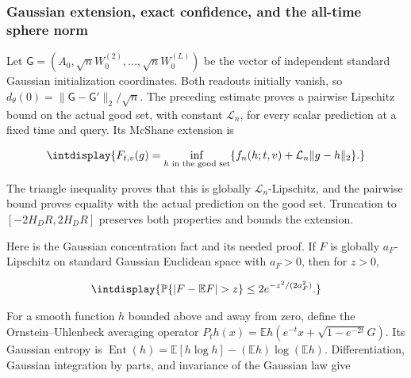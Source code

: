 \subsubsection{Gaussian extension, exact confidence, and the all-time sphere norm}
\label{int:dense-gaussian-concentration}


Let \(\mathsf G=(A_0,\allowbreak \sqrt nW_0^{(2)},\allowbreak \ldots,\allowbreak \sqrt nW_0^{(L)})\) be the vector of independent standard Gaussian initialization coordinates. Both readouts initially vanish, so \(d_\theta(0)=\|\mathsf G-\mathsf G'\|_2/\sqrt n\). The preceding estimate proves a pairwise Lipschitz bound on the actual good set, with constant \(\mathcal L_n\), for every scalar prediction at a fixed time and query. Its McShane extension is


\begingroup\renewcommand{\theHequation}{intdisplay.470}
\begin{equation*}
\intdisplay{
F_{t,v}(g)=\inf_{h\text{ in the good set}}
\{f_n(h;t,v)+\mathcal L_n\|g-h\|_2\}.
}
\end{equation*}
\endgroup


The triangle inequality proves that this is globally \(\mathcal L_n\)-Lipschitz, and the pairwise bound proves equality with the actual prediction on the good set. Truncation to \([-2H_DR,\allowbreak 2H_DR]\) preserves both properties and bounds the extension.



Here is the Gaussian concentration fact and its needed proof. If \(F\) is globally \(a_F\)-Lipschitz on standard Gaussian Euclidean space with \(a_F>0\), then for \(z>0\),


\begingroup\renewcommand{\theHequation}{intdisplay.471}
\begin{equation*}
\intdisplay{
\mathbb P\{|F-\mathbb EF|>z\}\le2e^{-z^2/(2a_F^2)}.
}
\end{equation*}
\endgroup


For a smooth function \(h\) bounded above and away from zero, define the Ornstein--Uhlenbeck averaging operator \(P_th(x)=\mathbb Eh(e^{-t}x+\sqrt{1-e^{-2t}}G)\). Its Gaussian entropy is \(\operatorname{Ent}(h)=\mathbb E[h\log h] -(\mathbb Eh)\log(\mathbb Eh)\). Differentiation, Gaussian integration by parts, and invariance of the Gaussian law give



